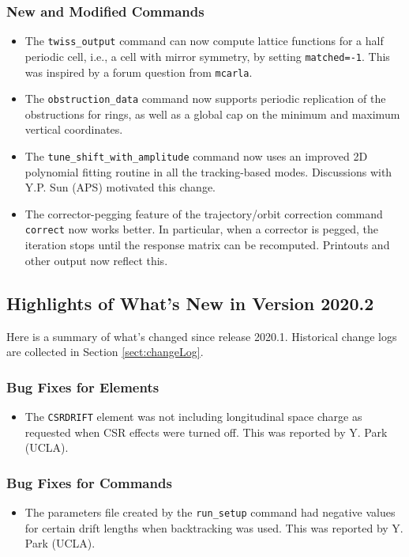 \documentclass[11pt]{article}
\begin{document}
\subsubsection{New and Modified Commands}
\begin{itemize}
\item The \verb|twiss_output| command can now compute lattice functions for a half periodic cell, i.e., a 
  cell with mirror symmetry, by setting \verb|matched=-1|. This was inspired by a forum question from \verb|mcarla|.
\item The \verb|obstruction_data|  command now supports periodic replication of the obstructions for rings, as well
  as a global cap on the minimum and maximum vertical coordinates.
\item The \verb|tune_shift_with_amplitude| command now uses an improved 2D polynomial fitting routine in all the
  tracking-based modes. Discussions with Y.P. Sun (APS) motivated this change.
\item The corrector-pegging feature of the trajectory/orbit correction command \verb|correct| now works better.
  In particular, when a corrector is pegged, the iteration stops until the response matrix can be recomputed.
  Printouts and other output now reflect this.
\end{itemize}

\subsection{Highlights of What's New in Version 2020.2}

Here is a summary of what's changed since release 2020.1.  Historical change logs are collected in Section
\ref{sect:changeLog}.

\subsubsection{Bug Fixes for Elements}

\begin{itemize}
\item The \verb|CSRDRIFT| element was not including longitudinal space charge as requested when CSR effects were turned
off.  This was reported by Y. Park (UCLA).
\end{itemize}

\subsubsection{Bug Fixes for Commands}
\begin{itemize}
\item The parameters file created by the \verb|run_setup| command had negative values for certain drift lengths when
backtracking was used.  This was reported by Y. Park (UCLA).
\end{itemize}
\end{document}
